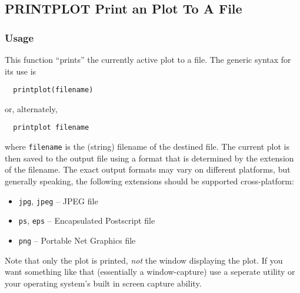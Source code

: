 %
%
%
\subsection{PRINTPLOT Print an Plot To A File}
\subsubsection{Usage}
This function ``prints'' the currently active plot to a file.  The 
generic syntax for its use is
\begin{verbatim}
  printplot(filename)
\end{verbatim}
or, alternately,
\begin{verbatim}
  printplot filename
\end{verbatim}
where \verb|filename| is the (string) filename of the destined file.  The current
plot is then saved to the output file using a format that is determined
by the extension of the filename.  The exact output formats may vary on
different platforms, but generally speaking, the following extensions
should be supported cross-platform:
\begin{itemize}
\item \verb|jpg|, \verb|jpeg|  --  JPEG file 
\item \verb|ps|, \verb|eps| -- Encapsulated Postscript file 
\item \verb|png| -- Portable Net Graphics file
\end{itemize}
Note that only the plot is printed, \emph{not} the window displaying
the plot.  If you want something like that (essentially a window-capture)
use a seperate utility or your operating system's built in screen
capture ability.
